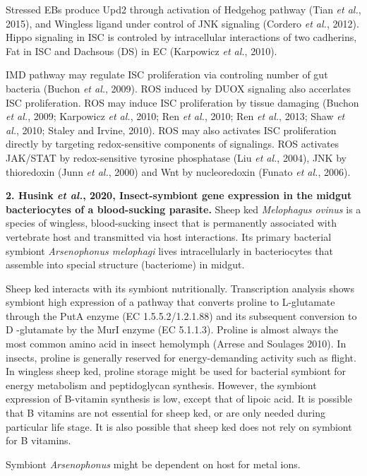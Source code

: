 \documentclass[11pt]{article}
\begin{document}
\begin{sloppypar}
Stressed EBs produce Upd2 through activation of Hedgehog pathway (Tian \textit{et al.}, 2015), and Wingless ligand under control of JNK signaling (Cordero \textit{et al.}, 2012). 
Hippo signaling in ISC is controled by intracellular interactions of two cadherins, Fat in ISC and Dachsous (DS) in EC (Karpowicz \textit{et al.}, 2010). 
\par
IMD pathway may regulate ISC proliferation via controling number of gut bacteria (Buchon \textit{et al.}, 2009). 
ROS induced by DUOX signaling also accerlates ISC proliferation. 
ROS may induce ISC proliferation by tissue damaging (Buchon \textit{et al.}, 2009; Karpowicz \textit{et al.}, 2010; Ren \textit{et al.}, 2010; Ren \textit{et al.}, 2013; Shaw \textit{et al.}, 2010; Staley and Irvine, 2010). 
ROS may also activates ISC proliferation directly by targeting redox-sensitive components of signalings. 
ROS activates JAK/STAT by redox-sensitive tyrosine phosphatase (Liu \textit{et al.}, 2004), JNK by thioredoxin (Junn \textit{et al.}, 2000) and Wnt by nucleoredoxin (Funato \textit{et al.}, 2006).
\par
\textbf{2. Husink \textit{et al.}, 2020, Insect-symbiont gene expression in the midgut bacteriocytes of a blood-sucking parasite.}
Sheep ked \textit{Melophagus ovinus} is a species of wingless, blood-sucking insect that is permanently associated with vertebrate host and transmitted via host interactions. 
Its primary bacterial symbiont \textit{Arsenophonus melophagi} lives intracellularly in bacteriocytes that assemble into special structure (bacteriome) in midgut. 
\par
Sheep ked interacts with its symbiont nutritionally. 
Transcription analysis shows symbiont high expression of a pathway that converts proline to L-glutamate through the PutA enzyme (EC 1.5.5.2/1.2.1.88) and its subsequent conversion to D -glutamate by the MurI enzyme (EC 5.1.1.3). 
Proline is almost always the most common amino acid in insect hemolymph (Arrese and Soulages 2010). 
In insects, proline is generally reserved for energy-demanding activity such as flight. 
In wingless sheep ked, proline storage might be used for bacterial symbiont for energy metabolism and peptidoglycan synthesis. 
However, the symbiont expression of B-vitamin synthesis is low, except that of lipoic acid. 
It is possible that B vitamins are not essential for sheep ked, or are only needed during particular life stage. 
It is also possible that sheep ked does not rely on symbiont for B vitamins.
\par
Symbiont \textit{Arsenophonus} might be dependent on host for metal ions. 

\end{sloppypar}
\end{document}
